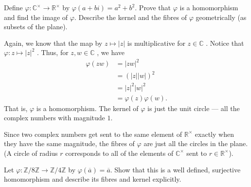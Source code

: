 \documentclass[12 pt, letterpaper]{hmcpset}
\begin{document}
\pagebreak

\begin{problem}
	Define $\varphi : \mathbb{C}^{\times} \to \mathbb{R}^{\times}$ by $\varphi(a + bi) = a^{2} + b^{2}$. Prove that $\varphi$ is a homomorphism and find the image of $\varphi$. Describe the kernel and the fibres of $\varphi$ geometrically (as subsets of the plane).
\end{problem}

\begin{solution}
	Again, we know that the map by $z \mapsto \lvert z \rvert$  is multiplicative for $z \in \mathbb{C}$ . Notice that $\varphi : z \mapsto \lvert z \rvert^{2}$ . Thus, for $z, w \in \mathbb{C}$ , we have
	\[
		\begin{split}
			\varphi(zw) & = \lvert zw \rvert^{2} \\
				    & = (\lvert z \rvert \lvert w \rvert)^{2} \\
				    & = \lvert z \rvert^{2} \lvert w \rvert^{2} \\
				    & = \varphi(z) \varphi(w).
		\end{split}
	\] 
	That is, $\varphi$ is a homomorphism. The kernel of $\varphi$ is just the unit circle --- all the complex numbers with magnitude $1$. 

	Since two complex numbers get sent to the same element of $\mathbb{R}^{\times}$ exactly when they have the same magnitude, the fibres of $\varphi$ are just all the circles in the plane. (A circle of radius $r$ corresponds to all of the elements of $\mathbb{C}^{\times}$ sent to $r \in \mathbb{R}^{\times}$).
\end{solution}

\pagebreak

\begin{problem}
	Let $\varphi : \mathbb{Z}/8\mathbb{Z} \to \mathbb{Z}/4\mathbb{Z}$ by $\varphi(\overline{a}) = \overline{a}$. Show that this is a well defined, surjective homomorphism and describe its fibres and kernel explicitly.
\end{problem}
\end{document}
